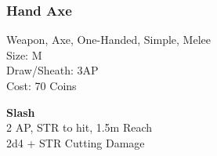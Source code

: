 \subsubsection{Hand Axe}\label{weapon:handAxe}
Weapon, Axe, One-Handed, Simple, Melee\\
Size: M\\
Draw/Sheath: 3AP\\
Cost: 70 Coins

\textbf{Slash}\\
2 AP, STR to hit, 1.5m Reach\\
2d4 + \texttimes STR Cutting Damage

